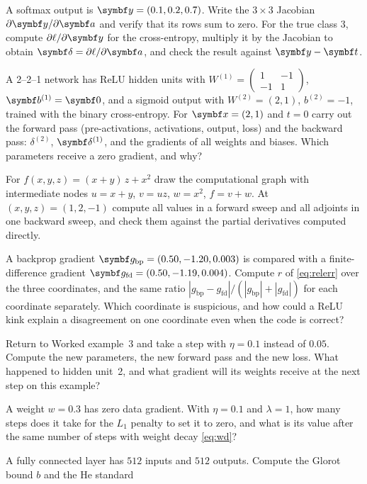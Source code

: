\documentclass[11pt]{article}
\newcommand{\av}{\vect{a}}
\newcommand{\bv}{\vect{b}}
\newcommand{\yv}{\vect{y}}
\newcommand{\tvec}{\vect{t}}
\newcommand{\dv}{\vect{\delta}}
\newcommand{\gvec}{\vect{g}}
\begin{document}
\begin{questions}
\begin{calculations}
\item A softmax output is $\yv = (0.1, 0.2, 0.7)$. Write the $3 \times 3$ Jacobian $\partial\yv/\partial\av$ and verify
  that its rows sum to zero. For the true class $3$, compute $\partial\ell/\partial\yv$ for the cross-entropy, multiply
  it by the Jacobian to obtain $\dv = \partial\ell/\partial\av$, and check the result against $\yv - \tvec$.
\item A 2--2--1 network has ReLU hidden units with $W^{(1)} = \begin{pmatrix} 1 & -1 \\ -1 & 1\end{pmatrix}$, $\bv^{(1)} = \vect{0}$,
  and a sigmoid output with $W^{(2)} = (2, 1)$, $b^{(2)} = -1$, trained with the binary cross-entropy. For $\x = (2, 1)$ and
  $t = 0$ carry out the forward pass (pre-activations, activations, output, loss) and the backward pass: $\delta^{(2)}$,
  $\dv^{(1)}$, and the gradients of all weights and biases. Which parameters receive a zero gradient, and why?
\item For $f(x, y, z) = (x + y)\,z + x^2$ draw the computational graph with intermediate nodes $u = x + y$, $v = uz$,
  $w = x^2$, $f = v + w$. At $(x, y, z) = (1, 2, -1)$ compute all values in a forward sweep and all adjoints in one backward
  sweep, and check them against the partial derivatives computed directly.
\item A backprop gradient $\gvec_{\mathrm{bp}} = (0.50, -1.20, 0.003)$ is compared with a finite-difference gradient
  $\gvec_{\mathrm{fd}} = (0.50, -1.19, 0.004)$. Compute $r$ of \eqref{eq:relerr} over the three coordinates, and the same
  ratio $|g_{\mathrm{bp}} - g_{\mathrm{fd}}|/(|g_{\mathrm{bp}}| + |g_{\mathrm{fd}}|)$ for each coordinate separately.
  Which coordinate is suspicious, and how could a ReLU kink explain a disagreement on one coordinate even when the code
  is correct?
\item Return to Worked example~3 and take a step with $\eta = 0.1$ instead of $0.05$. Compute the new parameters, the new
  forward pass and the new loss. What happened to hidden unit~2, and what gradient will its weights receive at the next
  step on this example?
\item A weight $w = 0.3$ has zero data gradient. With $\eta = 0.1$ and $\lambda = 1$, how many steps does it take for the
  $L_1$ penalty to set it to zero, and what is its value after the same number of steps with weight decay
  \eqref{eq:wd}?
\item A fully connected layer has $512$ inputs and $512$ outputs. Compute the Glorot bound $b$ and the He standard

\end{calculations}
\end{questions}
\end{document}
